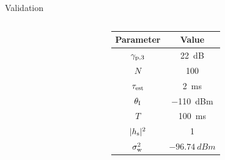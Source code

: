 \documentclass[16pt]{beamer}
\newcommand{\fs}[2]{\fontsize{#1 pt}{#2}\selectfont}
\begin{document}
\begin{frame}[c]{Validation}
\begin{columns}
\begin{column}{0.45\columnwidth}
		\end{column}
		\begin{column}{0.55\columnwidth}
		\fs{7}{8}
		\begin{overlayarea}{\textwidth}{3.1cm}
			\vspace{2mm}	
		\begin{center}
		\centering
		\begin{tabular}{c||c}
                	\rowcolor{kit-green30}
			Parameter & Value \\ \hline \hline
                	${\gamma}_{\text{p,3}}$ & \SI{22}{dB} \\
                	$N$ & 100 \\
                	$\tau_{\text{est}}$ & \SI{2}{ms}\\
                	$\theta_{\text{I}}$ & \SI{-110}{dBm}\\
                	$T$ & \SI{100}{ms}\\
               		$|h_{\text{s}}|^2$ & 1 \\
                	$\sigma^2_{\text{w}}$ & $\SI{-96.74}{dBm}$\\ \hline
        	\end{tabular}
		\end{center}
		\end{overlayarea}
\end{column}
\end{columns}
\end{frame}
\end{document}
